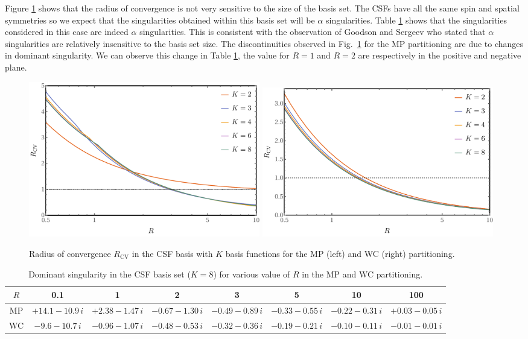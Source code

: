 \documentclass[11pt,a4paper]{article}
\begin{document}
Figure \ref{fig:RadiusBasis} shows that the radius of convergence is not very sensitive to the size of the basis set. The CSFs have all the same spin and spatial symmetries so we expect that the singularities obtained within this basis set will be $\alpha$ singularities. Table \ref{tab:SingAlpha} shows that the singularities considered in this case are indeed $\alpha$ singularities. This is consistent with the observation of Goodson and Sergeev \cite{Goodson_2004} who stated that $\alpha$ singularities are relatively insensitive to the basis set size. The discontinuities observed in Fig.~\ref{fig:RadiusBasis} for the MP partitioning are due to changes in dominant singularity. We can observe this change in Table \ref{tab:SingAlpha}, the value for $R=1$ and $R=2$ are respectively in the positive and negative plane.

\begin{figure}
    \centering
    \includegraphics[width=0.49\textwidth]{MPlargebasis.pdf}
    \includegraphics[width=0.49\textwidth]{WCElargebasis.pdf}
    \caption{Radius of convergence $R_{\text{CV}}$ in the CSF basis with $K$ basis functions for the MP (left) and WC (right) partitioning.}
    \label{fig:RadiusBasis}
\end{figure}

\begin{table}
\centering
\footnotesize
\caption{Dominant singularity in the CSF basis set ($K=8$) for various value of $R$ in the MP and WC partitioning.}
\begin{tabular}{cccccccc}
\hline
\hline
$R$ & 0.1 & 1 & 2 & 3 & 5 & 10 & 100 \\
\hline
MP & $+14.1-10.9\,i$ & $+2.38-1.47\,i$ & $-0.67-1.30\,i$ & $-0.49-0.89\,i$ & $-0.33-0.55\,i$ & $-0.22-0.31\,i$ & $+0.03-0.05\,i$ \\
WC & $-9.6-10.7\,i$ & $-0.96-1.07\,i$ & $-0.48-0.53\,i$ & $-0.32-0.36\,i$ & $-0.19-0.21\,i$ & $-0.10-0.11\,i$ & $-0.01-0.01\,i$ \\
\hline
\hline
\end{tabular}
\label{tab:SingAlpha}
\end{table}
\end{document}
